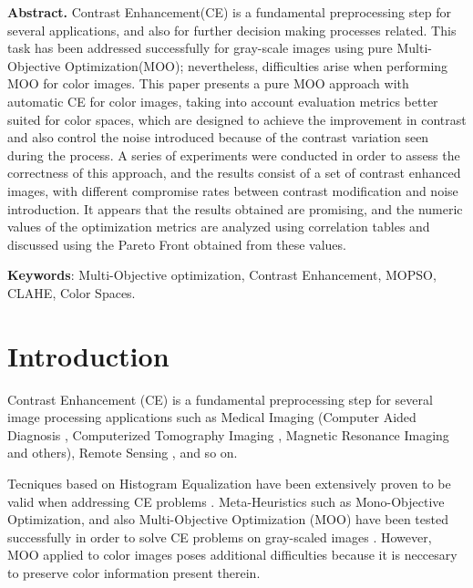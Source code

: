 \documentclass[11pt]{article}
\begin{document}
\noindent
\begin{addmargin}[2.5em]{2.5em}
\textbf{Abstract.} \small{Contrast Enhancement(CE) is a fundamental preprocessing step for several applications, and also for further decision making processes related. This task has been addressed successfully for gray-scale images using pure Multi-Objective Optimization(MOO); nevertheless, difficulties arise when performing MOO for color images. This paper presents a pure MOO approach with automatic CE for color images, taking into account evaluation metrics better suited for color spaces, which are designed to achieve the improvement in contrast and also control the noise introduced because of the contrast variation seen during the process. A series of experiments were conducted in order to assess the correctness of this approach, and the results consist of a set of contrast enhanced images, with different compromise rates between contrast modification and noise introduction. It appears that the results obtained are promising, and the numeric values of the optimization metrics are analyzed using correlation tables and discussed using the Pareto Front obtained from these values.
}

\quad

{\footnotesize
{\bf Keywords}: Multi-Objective optimization, Contrast Enhancement, MOPSO, CLAHE, Color Spaces.}


\end{addmargin}


\section{Introduction}

Contrast Enhancement (CE) is a fundamental preprocessing step for several image processing applications such as Medical Imaging (Computer Aided Diagnosis \cite{doi2007computer}, Computerized Tomography Imaging \cite{kak2001principles}, Magnetic Resonance Imaging \cite{doi:10.1056/NEJM199303113281008} and others), Remote Sensing \cite{lillesand2014remote}, and so on.

Tecniques based on Histogram Equalization have been extensively proven to be valid when addressing CE problems \cite{Gonzalez02a,pizer1987adaptive,zuiderveld1994contrast,580378}. Meta-Heuristics such as Mono-Objective Optimization, and also Multi-Objective Optimization (MOO) have been tested successfully in order to solve CE problems on gray-scaled images \cite{morepso,more2015parameter,812529,HOSEINI2013879}. However, MOO applied to color images poses additional difficulties because it is neccesary to preserve color information present therein.%
\end{document}
